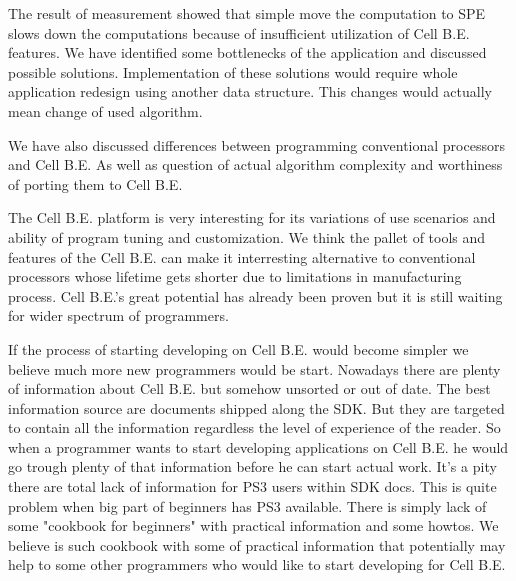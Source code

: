 \par
The result of measurement showed that simple move the computation to SPE slows down the computations because of insufficient utilization of Cell B.E. features.
We have identified some bottlenecks of the application and discussed possible solutions.
Implementation of these solutions would require whole application redesign using another data structure.
This changes would actually mean change of used algorithm.

\par
We have also discussed differences between programming conventional processors and Cell B.E.
As well as question of actual algorithm complexity and worthiness of porting them to Cell B.E.

\par
The Cell B.E. platform is very interesting for its variations of use scenarios and ability of program tuning and customization.
We think the pallet of tools and features of the Cell B.E. can make it interresting alternative to conventional processors whose lifetime gets shorter due to limitations in manufacturing process.
Cell B.E.'s great potential has already been proven but it is still waiting for wider spectrum of programmers.

\par
If the process of starting developing on Cell B.E. would become simpler we believe much more new programmers would be start.
Nowadays there are plenty of information about Cell B.E. but somehow unsorted or out of date.
The best information source are documents shipped along the SDK.
But they are targeted to contain all the information regardless the level of experience of the reader.
So when a programmer wants to start developing applications on Cell B.E. he would go trough plenty of that information before he can start actual work.
It's a pity there are total lack of information for PS3 users within SDK docs.
This is quite problem when big part of beginners has PS3 available.
There is simply lack of some "cookbook for beginners" with practical information and some howtos.
We believe is such cookbook with some of practical information that potentially may help to some other programmers who would like to start developing for Cell B.E.